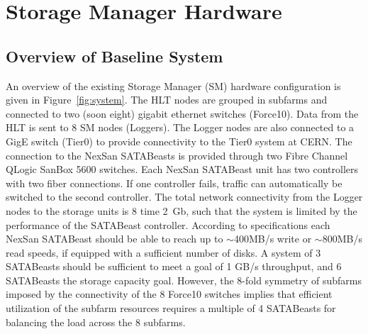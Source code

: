 
\section{\label{sec:stohard}Storage Manager Hardware}  %

\subsection{Overview of Baseline System} 
An overview of the existing  Storage Manager (SM) hardware configuration 
is given in Figure~\ref{fig:system}. 
The HLT nodes are grouped in subfarms and connected to two (soon eight) 
gigabit ethernet switches (Force10). 
Data from the HLT is sent to 8 SM nodes (Loggers). 
The Logger nodes are also connected to a GigE switch (Tier0) to provide connectivity 
to the Tier0 system at CERN.
The connection to the NexSan SATABeasts is provided through two Fibre Channel QLogic SanBox 5600 
switches. Each NexSan SATABeast unit has two controllers with two fiber connections. 
If one controller fails, traffic can automatically be switched to the second controller. 
The total network connectivity from the Logger nodes to the storage units is 8 time 2~Gb, 
such that the system is limited by the performance of the SATABeast controller. 
According to specifications each NexSan SATABeast should be able to reach up to $\sim$400MB/s write 
or $\sim$800MB/s read speeds, if equipped with a sufficient number of disks.
A system of 3 SATABeasts should be sufficient to meet a goal of 1 GB/s throughput,
and 6  SATABeasts the storage capacity goal.
However, the 8-fold symmetry of subfarms imposed by the connectivity 
of the 8 Force10 switches implies that efficient utilization of the subfarm resources
requires a multiple of 4 SATABeasts for balancing the load across the 8 subfarms.

